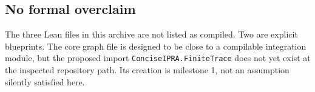 \subsection*{No formal overclaim}

The three Lean files in this archive are not listed as compiled.  Two are
explicit blueprints.  The core graph file is designed to be close to a
compilable integration module, but the proposed import
\texttt{ConciseIPRA.FiniteTrace} does not yet exist at the inspected repository
path.  Its creation is milestone 1, not an assumption silently satisfied here.
